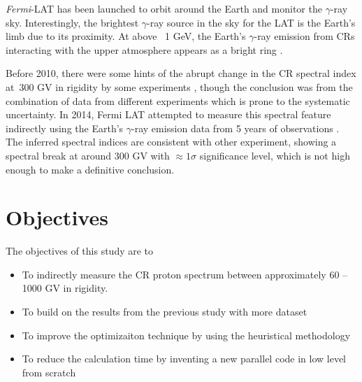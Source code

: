 \textit{Fermi}-LAT has been launched to orbit around the
Earth and monitor the $\gamma$-ray sky.
Interestingly, the brightest $\gamma$-ray source in the sky for
the LAT is the Earth's limb due to its proximity. At above ~1 GeV,
the Earth's $\gamma$-ray emission from CRs interacting with the
upper atmosphere appears as a bright ring \citep{FermiEarth09}.



Before 2010, there were some hints of the abrupt change in the CR
spectral index at~300 GV in rigidity by some experiments
\citep{adriani2011pamela,cream2004,atic2002,bess_experiment}
, though the conclusion was
from the combination of data from different experiments which
is prone to the systematic uncertainty. In 2014, Fermi LAT
attempted to measure this spectral feature indirectly using
the Earth's $\gamma$-ray emission data from 5 years of
observations \citep{FermiEarth14}. The inferred spectral
indices are consistent with other experiment, showing a spectral
break at around 300 GV with $\approx1\sigma$ significance level,
which is not high enough to make a definitive conclusion.



\section{Objectives}
The objectives of this study are to 
\begin{itemize}
    \item To indirectly measure the CR proton spectrum between approximately 60 -- 1000 GV in rigidity.
    \item To build on the results from the previous study with more dataset
    \item To improve the optimizaiton technique by using the heuristical methodology
    \item To reduce the calculation time by inventing a new
    parallel code in low level from scratch
\end{itemize}


